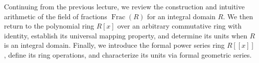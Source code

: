 


\begin{overview}[Context]
Continuing from the previous lecture, we review the construction and intuitive arithmetic of the field of fractions $\operatorname{Frac}(R)$ for an integral domain $R$. We then return to the polynomial ring $R[x]$ over an arbitrary commutative ring with identity, establish its universal mapping property, and determine its units when $R$ is an integral domain. Finally, we introduce the formal power series ring $R[[x]]$, define its ring operations, and characterize its units via formal geometric series.
\end{overview}

